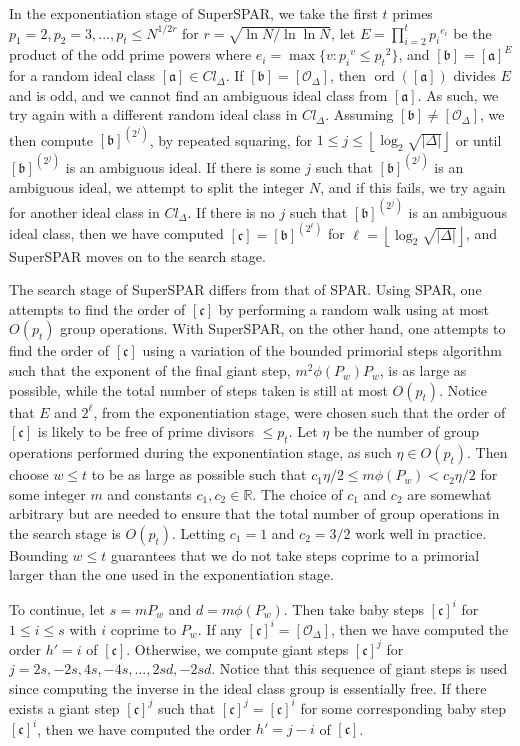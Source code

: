 \documentclass{ucalgthes1}
\theoremstyle{definition}
\DeclareMathOperator{\ord}{ord}
\newcommand{\RR}{\mathbb{R}}
\newcommand{\floor}[1]{\left\lfloor #1 \right\rfloor}
\newcommand{\ideal}{\mathfrak}
\newcommand{\idealclass}[1]{\left[ \ideal #1 \right]}
\newcommand{\aclass}{\idealclass a}
\newcommand{\bclass}{\idealclass b}
\newcommand{\cclass}{\idealclass c}
\newcommand{\idclass}{[\mathcal O_\Delta]}
\begin{document}
In the exponentiation stage of SuperSPAR, we take the first $t$ primes $p_1 = 2, p_2 = 3, ..., p_t \le N^{1/2r}$ for $r = \sqrt{\ln N / \ln \ln N}$, let $E = \prod_{i=2}^t {p_i}^{e_i}$ be the product of the odd prime powers where $e_i = \max \{ v : {p_i}^v \le {p_t}^2 \}$, and $\bclass = \aclass^E$ for a random ideal class $\aclass \in Cl_\Delta$.  If $\bclass = \idclass$, then $\ord(\aclass)$ divides $E$ and is odd, and we cannot find an ambiguous ideal class from $\aclass$.  As such, we try again with a different random ideal class in $Cl_\Delta$.  Assuming $\bclass \neq \idclass$, we then compute $\bclass^{\left(2^j\right)}$, by repeated squaring, for $1 \le j \le \floor{\log_2\sqrt{|\Delta|}}$ or until $\bclass^{\left(2^j\right)}$ is an ambiguous ideal.  If there is some $j$ such that $\bclass^{\left(2^j\right)}$ is an ambiguous ideal, we attempt to split the integer $N$, and if this fails, we try again for another ideal class in $Cl_\Delta$.  If there is no $j$ such that $\bclass^{\left(2^j\right)}$ is an ambiguous ideal class, then we have computed $\cclass = {\bclass}^{\left(2^\ell\right)}$ for $\ell=\floor{\log_2 \sqrt{|\Delta|}}$, and SuperSPAR moves on to the search stage.

The search stage of SuperSPAR differs from that of SPAR.  Using SPAR, one attempts to find the order of $\cclass$ by performing a random walk using at most $O(p_t)$ group operations.  With SuperSPAR, on the other hand, one attempts to find the order of $\cclass$ using a variation of the bounded primorial steps algorithm such that the exponent of the final giant step, $m^2\phi(P_w)P_w$, is as large as possible, while the total number of steps taken is still at most $O(p_t)$.  Notice that $E$ and $2^\ell$, from the exponentiation stage, were chosen such that the order of $\cclass$ is likely to be free of prime divisors $\le p_t$.  Let $\eta$ be the number of group operations performed during the exponentiation stage, as such $\eta \in O(p_t)$.  Then choose $w \le t$ to be as large as possible such that $c_1 \eta / 2 \le m\phi(P_w) < c_2 \eta / 2$ for some integer $m$ and constants $c_1, c_2 \in \RR$.  The choice of $c_1$ and $c_2$ are somewhat arbitrary but are needed to ensure that the total number of group operations in the search stage is $O(p_t)$.  Letting $c_1 = 1$ and $c_2 = 3/2$ work well in practice.  Bounding $w \le t$ guarantees that we do not take steps coprime to a primorial larger than the one used in the exponentiation stage.

To continue, let $s = mP_w$ and $d = m\phi(P_w)$.  Then take baby steps $\cclass^i$ for $1 \le i \le s$ with $i$ coprime to $P_w$.  If any $\cclass^i = \idclass$, then we have computed the order $h' = i$ of $\cclass$.  Otherwise, we compute giant steps $\cclass^j$ for $j=2s,-2s,4s,-4s,...,2sd,-2sd$.  Notice that this sequence of giant steps is used since computing the inverse in the ideal class group is essentially free.  If there exists a giant step $\cclass^j$ such that $\cclass^j = \cclass^i$ for some corresponding baby step $\cclass^i$, then we have computed the order $h' = j - i$ of $\cclass$.  
\end{document}
